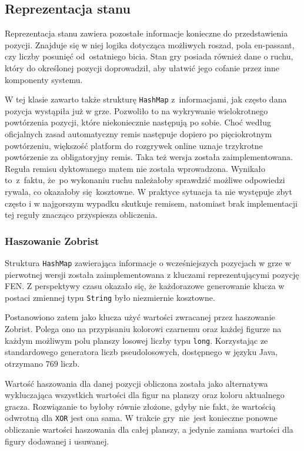 \subsection{Reprezentacja stanu}
\label{subsec:reprezentacja-stanu}

Reprezentacja stanu zawiera pozostałe informacje konieczne do przedstawienia pozycji.
Znajduje się w niej logika dotycząca możliwych roszad, pola en-passant, czy liczby posunięć od~ostatniego bicia.
Stan gry posiada również dane o ruchu, który do określonej pozycji doprowadził, aby ułatwić jego cofanie przez inne komponenty systemu.

W tej klasie zawarto także strukturę \texttt{HashMap} z~informacjami, jak często dana pozycja wystąpiła już w grze.
Pozwoliło to na wykrywanie wielokrotnego powtórzenia pozycji, które niekoniecznie następują po sobie.
Choć według oficjalnych zasad automatyczny remis następuje dopiero po pięciokrotnym powtórzeniu, większość platform do rozgrywek online uznaje trzykrotne powtórzenie za obligatoryjny remis.
Taka też wersja została zaimplementowana.
Reguła remisu dyktowanego matem nie została wprowadzona.
Wynikało to~z~faktu, że~po wykonaniu ruchu należałoby sprawdzić możliwe odpowiedzi rywala, co okazałoby się~kosztowne.
W praktyce sytuacja ta nie występuje zbyt często i w najgorszym wypadku skutkuje remisem, natomiast brak implementacji tej reguły znacząco przyspiesza obliczenia.

\subsubsection{Haszowanie Zobrist}
Struktura \texttt{HashMap} zawierająca informacje o wcześniejszych pozycjach w grze w pierwotnej wersji została zaimplementowana z kluczami reprezentującymi pozycję FEN.
Z perspektywy czasu okazało się, że każdorazowe generowanie klucza w postaci zmiennej typu \texttt{String} było niezmiernie kosztowne.

Postanowiono zatem jako klucza użyć wartości zwracanej przez haszowanie Zobrist.
Polega ono na przypisaniu kolorowi czarnemu oraz każdej figurze na każdym możliwym polu planszy losowej liczby typu \texttt{long}.
Korzystając ze standardowego generatora liczb pseudolosowych, dostępnego w języku Java, otrzymano $769$ liczb.

Wartość haszowania dla danej pozycji obliczona została jako alternatywa wykluczająca wszystkich wartości dla figur na planszy oraz koloru aktualnego gracza.
Rozwiązanie to byłoby równie złożone, gdyby nie fakt, że wartością odwrotną dla \texttt{XOR} jest ona sama.
W trakcie gry~nie~jest konieczne ponowne obliczanie wartości haszowania dla całej planszy, a jedynie zamiana wartości dla figury dodawanej i usuwanej.

